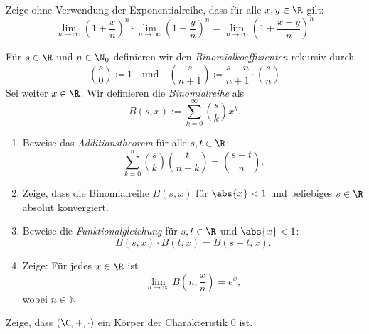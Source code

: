 \begin{prob}
  Zeige ohne Verwendung der Exponentialreihe, dass für alle $x, y \in \R$ gilt:
  \begin{equation*}
    \lim_{n\to\infty} \left( 1 + \frac{x}{n} \right)^n \cdot \lim_{n\to\infty} \left( 1 + \frac{y}{n} \right)^n
    =
    \lim_{n\to\infty} \left( 1 + \frac{x + y}{n} \right)^n
  \end{equation*}
\end{prob}

\begin{prob}
  Für $s \in \R$ und $n \in \N_0$ definieren wir den
  \textit{Binomialkoeffizienten} rekursiv durch
  \begin{equation*}
    \binom{s}{0} \coloneqq 1 \quad \text{und} \quad
    \binom{s}{n + 1} \coloneqq \frac{s - n}{n + 1} \cdot \binom{s}{n}
  \end{equation*}
  Sei weiter $x \in \R$. Wir definieren die \textit{Binomialreihe} als
  \begin{equation*}
    B(s,x):=\sum_{k=0}^\infty \binom{s}{k}x^k.
  \end{equation*}
  \begin{enumerate}[label=(\alph*)]
  \item Beweise das \emph{Additionstheorem} für alle $s, t \in \R$:
    \begin{equation*}
      \sum_{k=0}^n \binom{s}{k}\binom{t}{n - k}
      =
      \binom{s+t}{n}.
    \end{equation*}
  \item Zeige, dass die Binomialreihe $B(s,x)$ für $\abs{x} < 1$ und beliebiges
    $s \in \R$ absolut konvergiert.
  \item Beweise die \textit{Funktionalgleichung} für $s, t \in \R$ und
    $\abs{x} < 1$:
    \begin{equation*}
      B(s, x) \cdot B(t,x) = B(s + t, x).
    \end{equation*}
  \item Zeige: Für jedes $x \in \R$ ist
    \begin{equation*}
      \lim_{n\to\infty} B\left( n, \frac{x}{n} \right) = e^x,
    \end{equation*}
    wobei $n\in\mathbb{N}$
  \end{enumerate}
\end{prob}

\begin{prob}
  Zeige, dass $(\C, +, \cdot)$ ein Körper der Charakteristik $0$ ist.
\end{prob}

